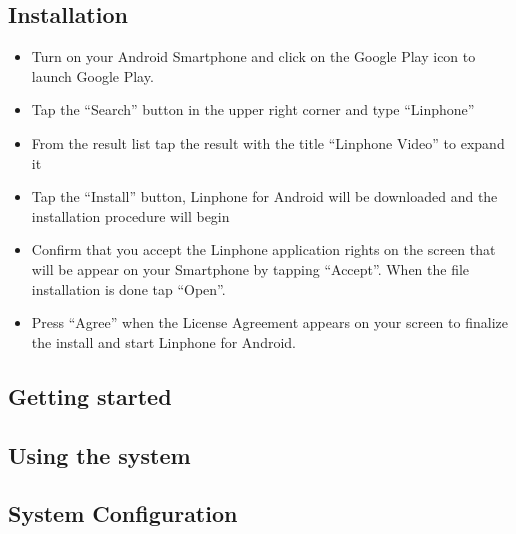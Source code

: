 \documentclass[a4paper]{article}
\begin{document}
\subsection{Installation}
\begin{itemize}
\item Turn on your Android Smartphone and click on the Google Play icon to launch Google Play.
\item Tap the “Search” button in the upper right corner and type “Linphone”
\item From the result list tap the result with the title “Linphone Video” to expand it
\item Tap the “Install” button, Linphone for Android will be downloaded and the installation procedure will begin
\item Confirm that you accept the Linphone application rights on the screen that will be appear on your Smartphone by tapping “Accept”. When the file installation is done tap “Open”.
\item Press “Agree” when the License Agreement appears on your screen to finalize the install and start Linphone for Android.
\end{itemize}

\subsection{Getting started}

\subsection{Using the system}

\subsection{System Configuration}
\end{document}

